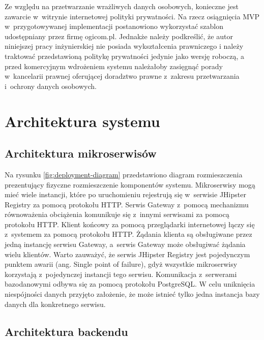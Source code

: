 \par
Ze względu na przetwarzanie wrażliwych danych osobowych, konieczne jest zawarcie w~witrynie internetowej polityki prywatności.
Na rzecz osiągnięcia MVP w~przygotowywanej implementacji postanowiono wykorzystać szablon udostępniany przez firmę ogicom.pl\cite{url:ogicom-privacy-policy}.
Jednakże należy podkreślić, że autor niniejszej pracy inżynierskiej nie posiada wykształcenia prawniczego
i należy traktować przedstawioną politykę prywatności jedynie jako wersję roboczą,
a przed komercyjnym wdrożeniem systemu należałoby zasięgnąć porady w~kancelarii prawnej oferującej doradztwo prawne z~zakresu przetwarzania i~ochrony danych osobowych.


\section{Architektura systemu}\label{sec:system-architecture}
\subsection{Architektura mikroserwisów}\label{subsec:system-architecture:microservices}

\noindent
{}

Na rysunku \ref{fig:deployment-diagram} przedstawiono diagram rozmieszczenia prezentujący fizyczne rozmieszczenie komponentów systemu.
Mikroserwisy mogą mieć wiele instancji, które po uruchomieniu rejestrują się w~serwisie JHipster Registry za pomocą protokołu HTTP.
Serwis Gateway z~pomocą mechanizmu równoważenia obciążenia komunikuje się z~innymi serwisami za pomocą protokołu HTTP.
Klient końcowy za pomocą przeglądarki internetowej łączy się z~systemem za pomocą protokołu HTTP.
Żądania klienta są obsługiwane przez jedną instancję serwisu Gateway, a~serwis Gateway może obsługiwać żądania wielu klientów.
Warto zauważyć, że serwis JHipster Registry jest pojedynczym punktem awarii (ang. Single point of failure), gdyż wszystkie mikroserwisy korzystają z~pojedynczej instancji tego serwisu.
Komunikacja z~serwerami bazodanowymi odbywa się za pomocą protokołu PostgreSQL.
W celu uniknięcia niespójności danych przyjęto założenie, że może istnieć tylko jedna instancja bazy danych dla konkretnego serwisu.

\subsection{Architektura backendu}\label{subsec:system-architecture:backend}

